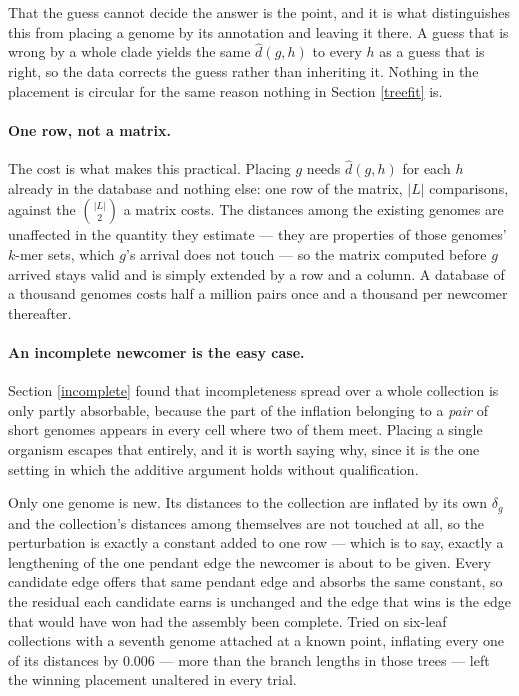 \documentclass[pdflatex,sn-vancouver-num]{sn-jnl}
\begin{document}
That the guess cannot decide the answer is the point, and it is what distinguishes this from
placing a genome by its annotation and leaving it there. A guess that is wrong by a whole clade
yields the same $\widehat{d}(g,h)$ to every $h$ as a guess that is right, so the data corrects the
guess rather than inheriting it. Nothing in the placement is circular for the same reason nothing in
Section \ref{treefit} is.

\paragraph{One row, not a matrix.} The cost is what makes this practical. Placing $g$ needs
$\widehat{d}(g,h)$ for each $h$ already in the database and nothing else: one row of the matrix,
$\lvert L \rvert$ comparisons, against the $\binom{\lvert L \rvert}{2}$ a matrix costs. The distances
among the existing genomes are unaffected in the quantity they estimate --- they are properties of
those genomes' $k$-mer sets, which $g$'s arrival does not touch --- so the matrix computed before $g$
arrived stays valid and is simply extended by a row and a column. A database of a thousand genomes
costs half a million pairs once and a thousand per newcomer thereafter.

\paragraph{An incomplete newcomer is the easy case.} Section \ref{incomplete} found that
incompleteness spread over a whole collection is only partly absorbable, because the part of the
inflation belonging to a \emph{pair} of short genomes appears in every cell where two of them meet.
Placing a single organism escapes that entirely, and it is worth saying why, since it is the one
setting in which the additive argument holds without qualification.

Only one genome is new. Its distances to the collection are inflated by its own $\delta_g$ and the
collection's distances among themselves are not touched at all, so the perturbation is exactly a
constant added to one row --- which is to say, exactly a lengthening of the one pendant edge the
newcomer is about to be given. Every candidate edge offers that same pendant edge and absorbs the
same constant, so the residual each candidate earns is unchanged and the edge that wins is the edge
that would have won had the assembly been complete. Tried on six-leaf collections with a seventh
genome attached at a known point, inflating every one of its distances by $0.006$ --- more than the
branch lengths in those trees --- left the winning placement unaltered in every trial.
\end{document}
